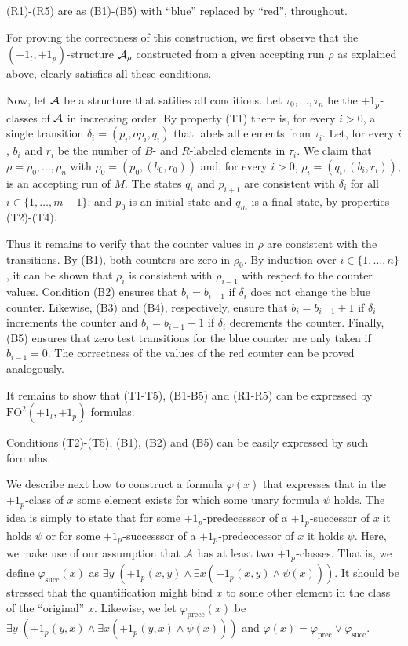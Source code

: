 \documentclass[11pt, a4paper]{article}
\renewcommand{\(}{\left (}
\renewcommand{\)}{\right )}
\theoremstyle{plain}
\newcommand{\fotwo}{\ensuremath{\mathrm{FO}^2}\xspace}
\newcommand{\psucc}[1][]{\ensuremath{{+1}_{p_{#1}}}}
\newcommand{\lsucc}[1][]{\ensuremath{{+1_{l_{#1}}}}}
\newcommand {\calA}      {{\cal A}\xspace}
\begin{document}
{(R1)-(R5) are as (B1)-(B5) with ``blue'' replaced by ``red'', throughout. 

  For proving the correctness of this construction, we first observe that the $(\lsucc, \psucc)$-structure $\calA_\rho$ constructed from a given accepting run $\rho$ as explained above, clearly satisfies all these conditions.


  Now, let $\calA$ be a structure that satifies all conditions. Let $\tau_0, \ldots, \tau_n$ be the $\psucc$-classes of $\calA$ in increasing order. By property (T1) there is, for every $i>0$, a single transition $\delta_{i} = (p_i, op_i, q_i)$ that labels all elements from $\tau_i$. Let, for every $i$, $b_i$ and $r_i$ be the number of $B$- and $R$-labeled elements in $\tau_i$. We claim that $\rho = \rho_0, \ldots, \rho_{n}$ with $\rho_0=(p_0,(b_0,r_0))$ and, for every $i>0$, $\rho_i = (q_i, (b_i, r_i))$, is an accepting run of $M$. The states $q_i$ and $p_{i+1}$ are consistent with $\delta_i$ for all $i \in \{1, \ldots, m-1\}$; and $p_0$ is an initial state and $q_m$ is a final state, by properties (T2)-(T4). 


Thus it remains to verify that the counter values in $\rho$ are consistent with the transitions. By (B1), both counters are zero in $\rho_0$. By induction over $i \in \{1, \ldots, n\}$, it can be shown that $\rho_i$ is consistent with $\rho_{i-1}$ with respect to the counter values. Condition (B2) ensures that $b_i=b_{i-1}$ if $\delta_i$ does not change the blue counter. Likewise, (B3) and (B4), respectively, ensure that  $b_i=b_{i-1}+1$ if $\delta_i$ increments the counter and  $b_i=b_{i-1}-1$ if $\delta_i$ decrements the counter. Finally, (B5) ensures that zero test transitions for the blue counter are only taken if $b_{i-1}=0$. The correctness of the values of the red counter can be proved analogously.

It remains to show that  (T1-T5), (B1-B5) and (R1-R5) can be expressed by $\fotwo (\lsucc, \psucc)$ formulas.
  
Conditions (T2)-(T5), (B1), (B2) and (B5) can be easily expressed by such formulas. 

We describe next how to construct a formula $\varphi(x)$ that expresses that in the $\psucc$-class of $x$ some element exists for which some unary formula $\psi$ holds. The idea is simply to state that for some \psucc-predecesssor of a \psucc-successor of $x$ it holds $\psi$ or  for some \psucc-successsor of a \psucc-predeccessor of $x$ it holds $\psi$. Here, we make use of our assumption that $\calA$ has at least two \psucc-classes.
That is, we define $\varphi_{\text{succ}}(x)$ as $\exists y\; (\psucc(x,y)\land \exists x (\psucc(x,y)\land \psi(x)))$. It should be stressed that the quantification might bind $x$ to some other element in the class of the ``original'' $x$. Likewise, we let $\varphi_{\text{precc}}(x)$ be $\exists y\; (\psucc(y,x)\land \exists x (\psucc(y,x)\land \psi(x)))$ and $\varphi(x)=\varphi_{\text{prec}}\lor \varphi_{\text{succ}}$. 

}
\end{document}
